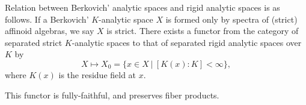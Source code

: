 Relation between Berkovich' analytic spaces and rigid analytic spaces is
as follows.
If a Berkovich' $K$-analytic space $X$ is formed only by spectra of 
(strict) affinoid algebras, we say $X$ is strict.
There exists a functor from the category of separated strict 
$K$-analytic spaces to that of separated rigid analytic spaces over $K$
by 
\begin{equation*}
 X\mapsto X_0=\{x\in X\ |\ [K(x)\colon K]<\infty\},
\end{equation*}
where $K(x)$ is the residue field at $x$.

\begin{appthm}
This functor is fully-faithful, and preserves fiber products.
\end{appthm}

